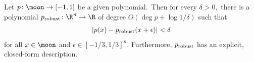 \begin{theorem}
\label{thm:main}
Let $p\colon\moon\to[-1,1]$ be a given polynomial.\ Then
for every $\delta>0,$ there is a polynomial $p_\text{\rm
robust}\colon\R^n\to\R$ of
degree $O(\deg p+\log 1/\delta)$ such that 
\begin{align*}
   \left|p(x) - p_\text{\rm robust}(x+\epsilon)\right| <\delta
\end{align*}
for all $x\in\moon$ and $\epsilon\in[-1/3,1/3]^n$.
Furthermore, $p_\text{\rm robust}$ has an explicit, closed-form
description.
\end{theorem}
